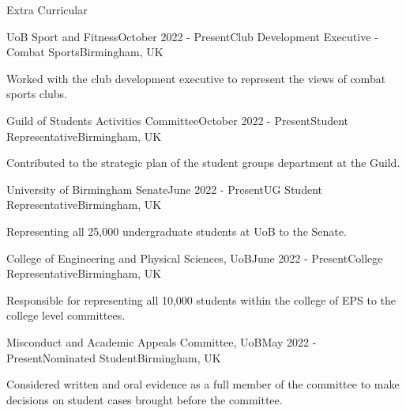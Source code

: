\documentclass{resume} %
\begin{document}



\begin{rSection}{Extra Curricular}
\begin{rSubsection}{UoB Sport and Fitness}{October 2022 - Present}{Club Development Executive - Combat Sports}{Birmingham, UK}
\item Worked with the club development executive to represent the views of combat sports clubs.
\end{rSubsection}
\begin{rSubsection}{Guild of Students Activities Committee}{October 2022 - Present}{Student Representative}{Birmingham, UK}
\item Contributed to the strategic plan of the student groups department at the Guild.
\end{rSubsection}

\begin{rSubsection}{University of Birmingham Senate}{June 2022 - Present}{UG Student Representative}{Birmingham, UK}
\item Representing all 25,000 undergraduate students at UoB to the Senate. 
\end{rSubsection}

\begin{rSubsection}{College of Engineering and Physical Sciences, UoB}{June 2022 - Present}{College Representative}{Birmingham, UK}
\item Responsible for representing all 10,000 students within the college of EPS to the college level committees. 
\end{rSubsection}

\begin{rSubsection}{Misconduct and Academic Appeals Committee, UoB}{May 2022 - Present}{Nominated Student}{Birmingham, UK}
\item Considered written and oral evidence as a full member of the committee to make decisions on student cases brought before the committee. 
\end{rSubsection}



\end{rSection}
\end{document}
